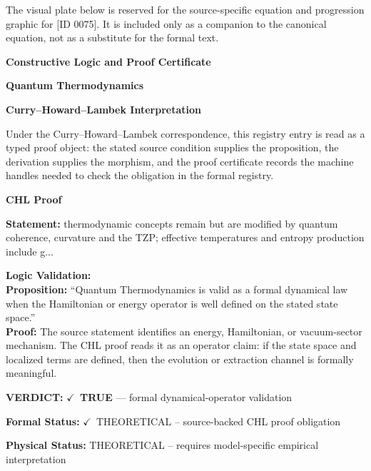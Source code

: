 \begingroup\footnotesize\sloppy
The visual plate below is reserved for the source-specific equation and progression graphic for [ID 0075]. It is included only as a companion to the canonical equation, not as a substitute for the formal text.
\par\endgroup
\ifTZPDarkEdition
{}
\fi

\clearpage
\begingroup\tzpsupportsetup
\noindent\textbf{\fontsize{10.8pt}{12.8pt}\selectfont [ID 0075] Constructive Logic and Proof Certificate}\par
\noindent\textbf{\fontsize{10pt}{12pt}\selectfont Quantum Thermodynamics}\par
\vspace{0.45em}
\begingroup
\footnotesize
\setlength{\parskip}{0.22em}
\setlength{\parindent}{0pt}
\noindent\textbf{Curry--Howard--Lambek Interpretation}\par
Under the Curry--Howard--Lambek correspondence, this registry entry is read as a typed proof
object: the stated source condition supplies the proposition, the derivation supplies the
morphism, and the proof certificate records the machine handles needed to check the obligation
in the formal registry.

\vspace{0.45em}
\noindent\textbf{CHL Proof}\par
\textbf{Statement:} thermodynamic concepts remain but are modified by quantum coherence, curvature and the
TZP; effective temperatures and entropy production include g...

\textbf{Logic Validation:}\\
\textbf{Proposition:} ``Quantum Thermodynamics is valid as a formal dynamical law when the Hamiltonian or energy
operator is well defined on the stated state space.''\\
\textbf{Proof:} The source statement identifies an energy, Hamiltonian, or vacuum-sector mechanism. The
CHL proof reads it as an operator claim: if the state space and localized terms are
defined, then the evolution or extraction channel is formally meaningful.

\textbf{VERDICT:} \ensuremath{\checkmark}\ \textbf{TRUE} --- formal dynamical-operator validation

\textbf{Formal Status:} \ensuremath{\checkmark}\ THEORETICAL -- source-backed CHL proof obligation

\textbf{Physical Status:} THEORETICAL -- requires model-specific empirical interpretation
\par\vspace{0.45em}
\par
\ifTZPDarkEdition
{}
\fi
\endgroup
\endgroup
